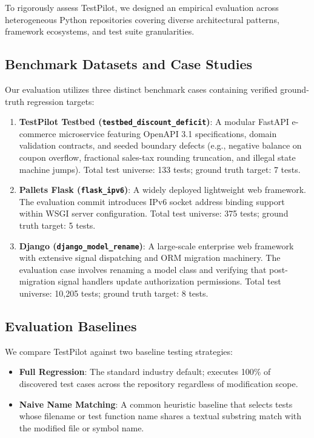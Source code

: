\documentclass[12pt,onecolumn,draftclsnofoot]{IEEEtran}
\begin{document}
To rigorously assess TestPilot, we designed an empirical evaluation across heterogeneous Python repositories covering diverse architectural patterns, framework ecosystems, and test suite granularities.

\subsection{Benchmark Datasets and Case Studies}
Our evaluation utilizes three distinct benchmark cases containing verified ground-truth regression targets:
\begin{enumerate}
    \item \textbf{TestPilot Testbed (\texttt{testbed\_discount\_deficit})}: A modular FastAPI e-commerce microservice featuring OpenAPI 3.1 specifications, domain validation contracts, and seeded boundary defects (e.g., negative balance on coupon overflow, fractional sales-tax rounding truncation, and illegal state machine jumps). Total test universe: 133 tests; ground truth target: 7 tests.
    \item \textbf{Pallets Flask (\texttt{flask\_ipv6})}: A widely deployed lightweight web framework. The evaluation commit introduces IPv6 socket address binding support within WSGI server configuration. Total test universe: 375 tests; ground truth target: 5 tests.
    \item \textbf{Django (\texttt{django\_model\_rename})}: A large-scale enterprise web framework with extensive signal dispatching and ORM migration machinery. The evaluation case involves renaming a model class and verifying that post-migration signal handlers update authorization permissions. Total test universe: 10,205 tests; ground truth target: 8 tests.
\end{enumerate}

\subsection{Evaluation Baselines}
We compare TestPilot against two baseline testing strategies:
\begin{itemize}
    \item \textbf{Full Regression}: The standard industry default; executes 100\% of discovered test cases across the repository regardless of modification scope.
    \item \textbf{Naive Name Matching}: A common heuristic baseline that selects tests whose filename or test function name shares a textual substring match with the modified file or symbol name.
\end{itemize}
\end{document}
